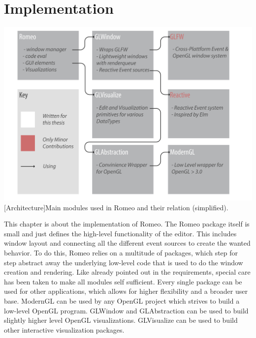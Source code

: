 \section{Implementation}

\vspace{1em}
\begin{minipage}{\linewidth}
    \centering
    \includegraphics[width=0.9\linewidth]{graphics/architecture.pdf}
    [Architecture]{Main modules used in Romeo and their relation (simplified).}
    \label{fig:architecture} 
\end{minipage}


This chapter is about the implementation of Romeo.
The Romeo package itself is small and just defines the high-level functionality of the editor.
This includes window layout and connecting all the different event sources to create the wanted behavior.
To do this, Romeo relies on a multitude of packages, which step for step abstract away the underlying low-level code that is used to do the window creation and rendering. 
Like already pointed out in the requirements, special care has been taken to make all modules self sufficient. 
Every single package can be used for other applications, which allows for higher flexibility and a broader user base.
ModernGL can be used by any OpenGL project which strives to build a low-level OpenGL program.
GLWindow and GLAbstraction can be used to build slightly higher level OpenGL visualizations. 
GLVisualize can be used to build other interactive visualization packages.

